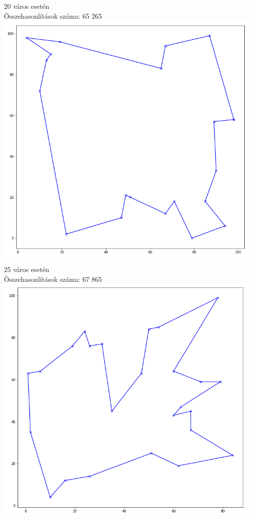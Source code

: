 \documentclass[12pt,a4paper]{article}
\begin{document}
\begin{flushleft}
20 város esetén \\
Összehasonlítások száma: 65 265
\includegraphics[scale=0.4]{20.png}
\end{flushleft}

\begin{flushleft}
25 város esetén \\
Összehasonlítások száma: 67 865
\includegraphics[scale=0.4]{25.png}
\end{flushleft}
\end{document}
